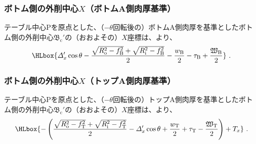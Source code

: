 \subsubsection{ボトム側の外削中心\texorpdfstring{$X$}{X}（ボトムA側肉厚基準）}
テーブル中心Pを原点とした、（$-\theta$回転後の）ボトムA側肉厚を基準としたボトム側の外削中心$\mathfrak B_\mathrm c'$の（おおよその）$X$座標は、より、
\begin{align*}
  \HLbox{%
    \varDelta_x'\cos\theta
    -\frac{\sqrt{R_\mathrm o^2-f_\mathrm B^2}+\sqrt{R_\mathrm i^2-f_\mathrm B^2}}2
    -\frac{w_\mathrm B}2
    -\tau_\mathrm B
    +\frac{\mathfrak W_\mathrm B}2
  }\ .
\end{align*}

\subsubsection{ボトム側の外削中心\texorpdfstring{$X$}{X}（トップA側肉厚基準）}
テーブル中心Pを原点とした、（$-\theta$回転後の）トップA側肉厚を基準としたボトム側の外削中心$\mathfrak B_\mathrm c'$の（おおよその）$X$座標は、より、
\begin{align*}
  \HLbox{%
    -\left(
      \frac{\sqrt{R_\mathrm o^2-f_\mathrm T^2}+\sqrt{R_\mathrm i^2-f_\mathrm T^2}}2
      -\varDelta_x'\cos\theta
      +\frac{w_\mathrm T}2
      +\tau_\mathrm T
      -\frac{\mathfrak W_\mathrm T}2
    \right)
    +T_x
  }\ .
\end{align*}


